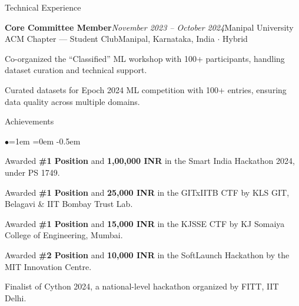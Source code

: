 \documentclass{resume} %
\begin{document}
\begin{rSection}{Technical Experience}
\begin{rSubsection}{\bf Core Committee Member}{\em November 2023 -- October 2024}{Manipal University ACM Chapter --- Student Club}{Manipal, Karnataka, India $\cdot$ Hybrid}
\item Co-organized the ``Classified'' ML workshop with 100+ participants, handling dataset curation and technical support.
\item Curated datasets for Epoch 2024 ML competition with 100+ entries, ensuring data quality across multiple domains.
\end{rSubsection}

\end{rSection}

\begin{rSection}{Achievements}
\begin{list}{$\bullet$}{\leftmargin=1em \itemindent=0em}
\itemsep -0.5em
\item Awarded \textbf{\#1 Position} and \textbf{1,00,000 INR} in the Smart India Hackathon 2024, under PS 1749.
\item Awarded \textbf{\#1 Position} and \textbf{25,000 INR} in the GITxIITB CTF by KLS GIT, Belagavi \& IIT Bombay Trust Lab.
\item Awarded \textbf{\#1 Position} and \textbf{15,000 INR} in the KJSSE CTF by KJ Somaiya College of Engineering, Mumbai.
\item Awarded \textbf{\#2 Position} and \textbf{10,000 INR} in the SoftLaunch Hackathon by the MIT Innovation Centre.
\item Finalist of Cython 2024, a national-level hackathon organized by FITT, IIT Delhi.
\end{list}
\end{rSection}
\end{document}
